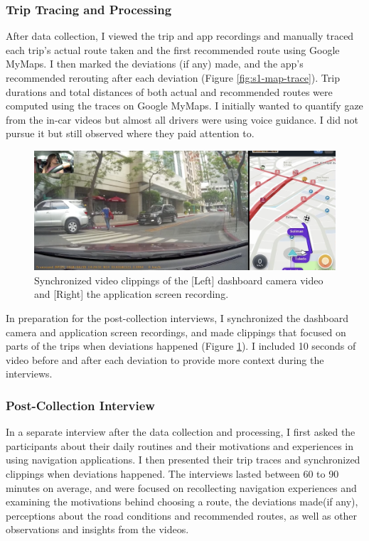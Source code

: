 \subsubsection{Trip Tracing and Processing}
After data collection, I viewed the trip and app recordings and manually traced each trip's actual route taken and the first recommended route using Google MyMaps. I then marked the deviations (if any) made, and the app's recommended rerouting after each deviation (Figure \ref{fig:s1-map-trace}). Trip durations and total distances of both actual and recommended routes were computed using the traces on Google MyMaps. I initially wanted to quantify gaze from the in-car videos but almost all drivers were using voice guidance. I did not pursue it but still observed where they paid attention to. 

\begin{figure}[t]
  \centering
  \includegraphics[scale=0.8]{figures/s1-dev-clips.png}
  \caption{Synchronized video clippings of the [Left] dashboard camera video and [Right] the application screen recording.}
  \label{fig:s1-dev-clips}
\end{figure}

In preparation for the post-collection interviews, I synchronized the dashboard camera and application screen recordings, and made clippings that focused on parts of the trips when deviations happened (Figure \ref{fig:s1-dev-clips}). I included 10 seconds of video before and after each deviation to provide more context during the interviews.

\subsubsection{Post-Collection Interview}
In a separate interview after the data collection and processing, I first asked the participants about their daily routines and their motivations and experiences in using navigation applications. I then presented their trip traces and synchronized clippings when deviations happened. The interviews lasted between 60 to 90 minutes on average, and were focused on recollecting navigation experiences and examining the motivations behind choosing a route, the deviations made(if any), perceptions about the road conditions and recommended routes, as well as other observations and insights from the videos. 

